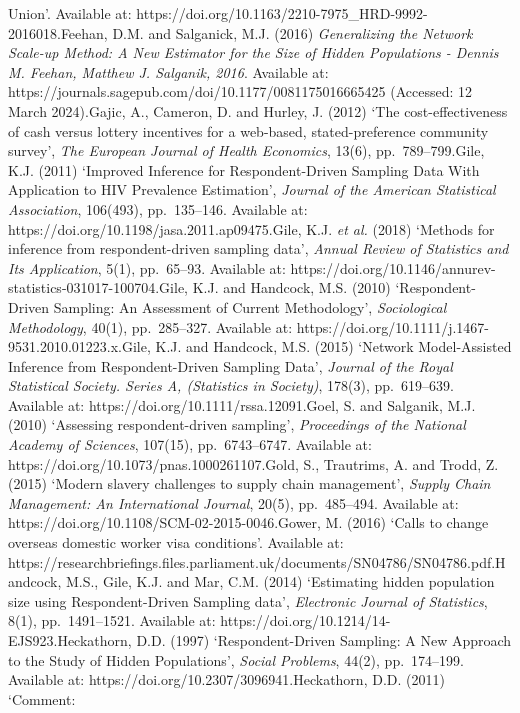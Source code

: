 \documentclass[
  12pt,
  letterpaper,
  DIV=11,
  numbers=noendperiod]{scrartcl}
\begin{document}
{{Union'. Available at:
https://doi.org/10.1163/2210-7975\_HRD-9992-2016018.Feehan, D.M. and
Salganick, M.J. (2016) \emph{Generalizing the Network Scale-up Method: A
New Estimator for the Size of Hidden Populations - Dennis M. Feehan,
Matthew J. Salganik, 2016}. Available at:
https://journals.sagepub.com/doi/10.1177/0081175016665425 (Accessed: 12
March 2024).Gajic, A., Cameron, D. and Hurley, J. (2012) `The
cost-effectiveness of cash versus lottery incentives for a web-based,
stated-preference community survey', \emph{The European Journal of
Health Economics}, 13(6), pp.~789--799.Gile, K.J. (2011) `Improved
Inference for Respondent-Driven Sampling Data With Application to HIV
Prevalence Estimation', \emph{Journal of the American Statistical
Association}, 106(493), pp.~135--146. Available at:
https://doi.org/10.1198/jasa.2011.ap09475.Gile, K.J. \emph{et al.}
(2018) `Methods for inference from respondent-driven sampling data',
\emph{Annual Review of Statistics and Its Application}, 5(1),
pp.~65--93. Available at:
https://doi.org/10.1146/annurev-statistics-031017-100704.Gile, K.J. and
Handcock, M.S. (2010) `Respondent-Driven Sampling: An Assessment of
Current Methodology', \emph{Sociological Methodology}, 40(1),
pp.~285--327. Available at:
https://doi.org/10.1111/j.1467-9531.2010.01223.x.Gile, K.J. and
Handcock, M.S. (2015) `Network Model-Assisted Inference from
Respondent-Driven Sampling Data', \emph{Journal of the Royal Statistical
Society. Series A, (Statistics in Society)}, 178(3), pp.~619--639.
Available at: https://doi.org/10.1111/rssa.12091.Goel, S. and Salganik,
M.J. (2010) `Assessing respondent-driven sampling', \emph{Proceedings of
the National Academy of Sciences}, 107(15), pp.~6743--6747. Available
at: https://doi.org/10.1073/pnas.1000261107.Gold, S., Trautrims, A. and
Trodd, Z. (2015) `Modern slavery challenges to supply chain management',
\emph{Supply Chain Management: An International Journal}, 20(5),
pp.~485--494. Available at:
https://doi.org/10.1108/SCM-02-2015-0046.Gower, M. (2016) `Calls to
change overseas domestic worker visa conditions'. Available at:
https://researchbriefings.files.parliament.uk/documents/SN04786/SN04786.pdf.Handcock,
M.S., Gile, K.J. and Mar, C.M. (2014) `Estimating hidden population size
using Respondent-Driven Sampling data', \emph{Electronic Journal of
Statistics}, 8(1), pp.~1491--1521. Available at:
https://doi.org/10.1214/14-EJS923.Heckathorn, D.D. (1997)
`Respondent-Driven Sampling: A New Approach to the Study of Hidden
Populations', \emph{Social Problems}, 44(2), pp.~174--199. Available at:
https://doi.org/10.2307/3096941.Heckathorn, D.D. (2011) `Comment:
}}
\end{document}
